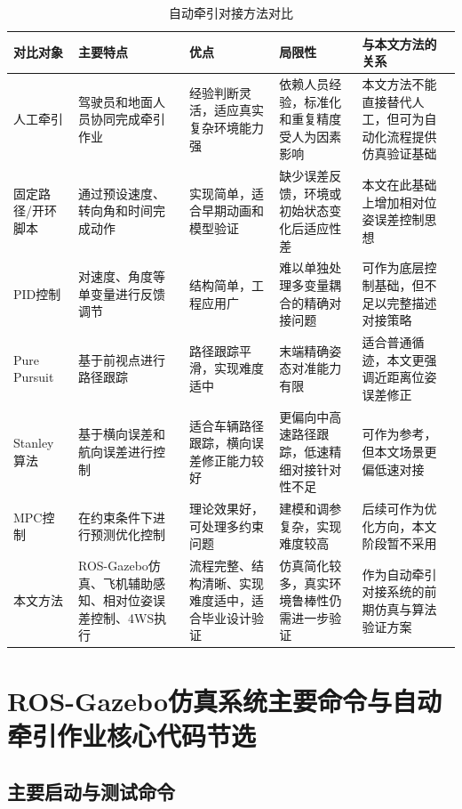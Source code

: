 \begin{table}[H]
\centering
\caption{自动牵引对接方法对比}
\label{tab:appendix_method_compare}
\scriptsize
\renewcommand{\arraystretch}{1.15}
\begin{tabularx}{\textwidth}{p{}p{}p{}p{}X}
\toprule
对比对象 & 主要特点 & 优点 & 局限性 & 与本文方法的关系 \\
\midrule
人工牵引 & 驾驶员和地面人员协同完成牵引作业 & 经验判断灵活，适应真实复杂环境能力强 & 依赖人员经验，标准化和重复精度受人为因素影响 & 本文方法不能直接替代人工，但可为自动化流程提供仿真验证基础 \\
固定路径/开环脚本 & 通过预设速度、转向角和时间完成动作 & 实现简单，适合早期动画和模型验证 & 缺少误差反馈，环境或初始状态变化后适应性差 & 本文在此基础上增加相对位姿误差控制思想 \\
PID控制 & 对速度、角度等单变量进行反馈调节 & 结构简单，工程应用广 & 难以单独处理多变量耦合的精确对接问题 & 可作为底层控制基础，但不足以完整描述对接策略 \\
Pure Pursuit & 基于前视点进行路径跟踪 & 路径跟踪平滑，实现难度适中 & 末端精确姿态对准能力有限 & 适合普通循迹，本文更强调近距离位姿误差修正 \\
Stanley算法 & 基于横向误差和航向误差进行控制 & 适合车辆路径跟踪，横向误差修正能力较好 & 更偏向中高速路径跟踪，低速精细对接针对性不足 & 可作为参考，但本文场景更偏低速对接 \\
MPC控制 & 在约束条件下进行预测优化控制 & 理论效果好，可处理多约束问题 & 建模和调参复杂，实现难度较高 & 后续可作为优化方向，本文阶段暂不采用 \\
本文方法 & ROS-Gazebo仿真、飞机辅助感知、相对位姿误差控制、4WS执行 & 流程完整、结构清晰、实现难度适中，适合毕业设计验证 & 仿真简化较多，真实环境鲁棒性仍需进一步验证 & 作为自动牵引对接系统的前期仿真与算法验证方案 \\
\bottomrule
\end{tabularx}
\end{table}



\chapter{ROS-Gazebo仿真系统主要命令与自动牵引作业核心代码节选}

\section{主要启动与测试命令}

